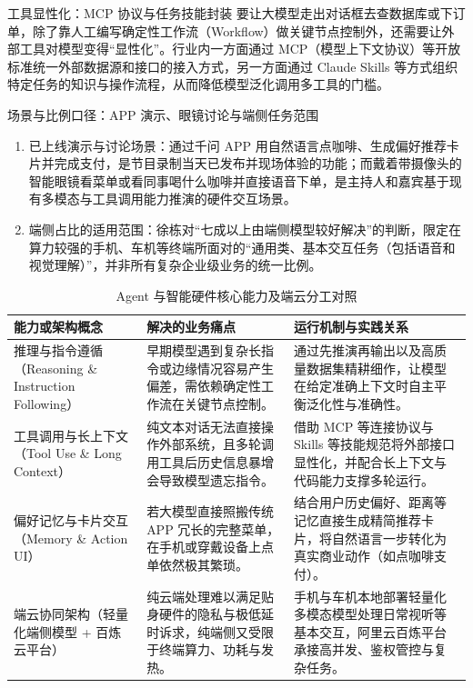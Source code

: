 \documentclass[UTF8,a4paper,11pt,fontset=fandol]{ctexart}
\begin{document}
\begin{knowledgebox}{工具显性化：MCP 协议与任务技能封装}
要让大模型走出对话框去查数据库或下订单，除了靠人工编写确定性工作流（Workflow）做关键节点控制外，还需要让外部工具对模型变得“显性化”。行业内一方面通过 MCP（模型上下文协议）等开放标准统一外部数据源和接口的接入方式，另一方面通过 Claude Skills 等方式组织特定任务的知识与操作流程，从而降低模型泛化调用多工具的门槛。
\end{knowledgebox}
\begin{warningbox}{场景与比例口径：APP 演示、眼镜讨论与端侧任务范围}
\begin{enumerate}
\item 已上线演示与讨论场景：通过千问 APP 用自然语言点咖啡、生成偏好推荐卡片并完成支付，是节目录制当天已发布并现场体验的功能；而戴着带摄像头的智能眼镜看菜单或看同事喝什么咖啡并直接语音下单，是主持人和嘉宾基于现有多模态与工具调用能力推演的硬件交互场景。
\item 端侧占比的适用范围：徐栋对“七成以上由端侧模型较好解决”的判断，限定在算力较强的手机、车机等终端所面对的“通用类、基本交互任务（包括语音和视觉理解）”，并非所有复杂企业级业务的统一比例。
\end{enumerate}
\end{warningbox}
\begin{table}[H]\centering\small
\caption{Agent 与智能硬件核心能力及端云分工对照}
\begin{tabular}{>{\raggedright\arraybackslash}p{\dimexpr(\linewidth-6\tabcolsep)/3\relax}>{\raggedright\arraybackslash}p{\dimexpr(\linewidth-6\tabcolsep)/3\relax}>{\raggedright\arraybackslash}p{\dimexpr(\linewidth-6\tabcolsep)/3\relax}}
\toprule
能力或架构概念 & 解决的业务痛点 & 运行机制与实践关系\\\midrule
推理与指令遵循（Reasoning \& Instruction Following） & 早期模型遇到复杂长指令或边缘情况容易产生偏差，需依赖确定性工作流在关键节点控制。 & 通过先推演再输出以及高质量数据集精耕细作，让模型在给定准确上下文时自主平衡泛化性与准确性。\\[4pt]
工具调用与长上下文（Tool Use \& Long Context） & 纯文本对话无法直接操作外部系统，且多轮调用工具后历史信息暴增会导致模型遗忘指令。 & 借助 MCP 等连接协议与 Skills 等技能规范将外部接口显性化，并配合长上下文与代码能力支撑多轮运行。\\[4pt]
偏好记忆与卡片交互（Memory \& Action UI） & 若大模型直接照搬传统 APP 冗长的完整菜单，在手机或穿戴设备上点单依然极其繁琐。 & 结合用户历史偏好、距离等记忆直接生成精简推荐卡片，将自然语言一步转化为真实商业动作（如点咖啡支付）。\\[4pt]
端云协同架构（轻量化端侧模型 + 百炼云平台） & 纯云端处理难以满足贴身硬件的隐私与极低延时诉求，纯端侧又受限于终端算力、功耗与发热。 & 手机与车机本地部署轻量化多模态模型处理日常视听等基本交互，阿里云百炼平台承接高并发、鉴权管控与复杂任务。\\[4pt]
\bottomrule\end{tabular}\end{table}
\end{document}

